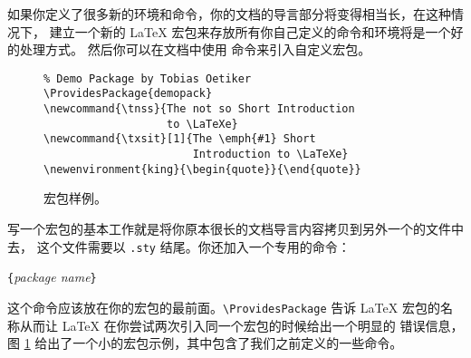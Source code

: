 如果你定义了很多新的环境和命令，你的文档的导言部分将变得相当长，在这种情况下，
建立一个新的 \LaTeX{} 宏包来存放所有你自己定义的命令和环境将是一个好的处理方式。
然后你可以在文档中使用  命令来引入自定义宏包。

\begin{figure}[!htbp]
\begin{lined}{\textwidth}
\begin{verbatim}
% Demo Package by Tobias Oetiker
\ProvidesPackage{demopack}
\newcommand{\tnss}{The not so Short Introduction
                   to \LaTeXe}
\newcommand{\txsit}[1]{The \emph{#1} Short
                       Introduction to \LaTeXe}
\newenvironment{king}{\begin{quote}}{\end{quote}}
\end{verbatim}
\end{lined}
\caption{宏包样例。} \label{package}
\end{figure}

写一个宏包的基本工作就是将你原本很长的文档导言内容拷贝到另外一个的文件中去，
 这个文件需要以 \texttt{.sty} 结尾。你还加入一个专用的命令：
\begin{lscommand}
\verb|{|\emph{package name}\verb|}|
\end{lscommand}
\noindent 这个命令应该放在你的宏包的最前面。\verb|\ProvidesPackage| 告诉 \LaTeX{} 
宏包的名称从而让 \LaTeX{} 在你尝试两次引入同一个宏包的时候给出一个明显的
错误信息，图 \ref{package} 给出了一个小的宏包示例，其中包含了我们之前定义的一些命令。

